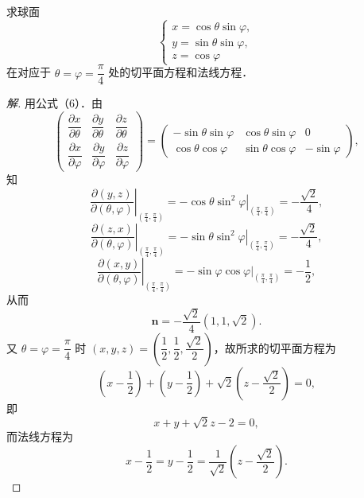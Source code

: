 \begin{example}\label{ex:16-3-3}
求球面
\[
\begin{cases}
x=\cos\theta\sin\varphi,\\
y=\sin\theta\sin\varphi,\\
z=\cos\varphi
\end{cases}
\]
在对应于 $\theta=\varphi=\dfrac{\pi}{4}$ 处的切平面方程和法线方程．
\end{example}

\begin{proof}[解]
用公式（6）．由
\[
\begin{pmatrix}\dfrac{\partial x}{\partial\theta}&\dfrac{\partial y}{\partial\theta}&\dfrac{\partial z}{\partial\theta}\\[6pt]
\dfrac{\partial x}{\partial\varphi}&\dfrac{\partial y}{\partial\varphi}&\dfrac{\partial z}{\partial\varphi}\end{pmatrix}=\begin{pmatrix}-\sin\theta\sin\varphi&\cos\theta\sin\varphi&0\\ \cos\theta\cos\varphi&\sin\theta\cos\varphi&-\sin\varphi\end{pmatrix},
\]
知
\[
\left.\frac{\partial(y,z)}{\partial(\theta,\varphi)}\right|_{\left(\frac{\pi}{4},\frac{\pi}{4}\right)}=\left.-\cos\theta\sin^{2}\varphi\right|_{\left(\frac{\pi}{4},\frac{\pi}{4}\right)}=-\frac{\sqrt{2}}{4},
\]
\[
\left.\frac{\partial(z,x)}{\partial(\theta,\varphi)}\right|_{\left(\frac{\pi}{4},\frac{\pi}{4}\right)}=\left.-\sin\theta\sin^{2}\varphi\right|_{\left(\frac{\pi}{4},\frac{\pi}{4}\right)}=-\frac{\sqrt{2}}{4},
\]
\[
\left.\frac{\partial(x,y)}{\partial(\theta,\varphi)}\right|_{\left(\frac{\pi}{4},\frac{\pi}{4}\right)}=\left.-\sin\varphi\cos\varphi\right|_{\left(\frac{\pi}{4},\frac{\pi}{4}\right)}=-\frac{1}{2},
\]
从而
\[
\bm{n}=-\frac{\sqrt{2}}{4}(1,1,\sqrt{2}).
\]
又 $\theta=\varphi=\dfrac{\pi}{4}$ 时 $(x,y,z)=\left(\dfrac{1}{2},\dfrac{1}{2},\dfrac{\sqrt{2}}{2}\right)$，故所求的切平面方程为
\[
\left(x-\frac{1}{2}\right)+\left(y-\frac{1}{2}\right)+\sqrt{2}\left(z-\frac{\sqrt{2}}{2}\right)=0,
\]
即
\[
x+y+\sqrt{2}z-2=0,
\]
而法线方程为
\[
x-\frac{1}{2}=y-\frac{1}{2}=\frac{1}{\sqrt{2}}\left(z-\frac{\sqrt{2}}{2}\right).
\]
\end{proof}

